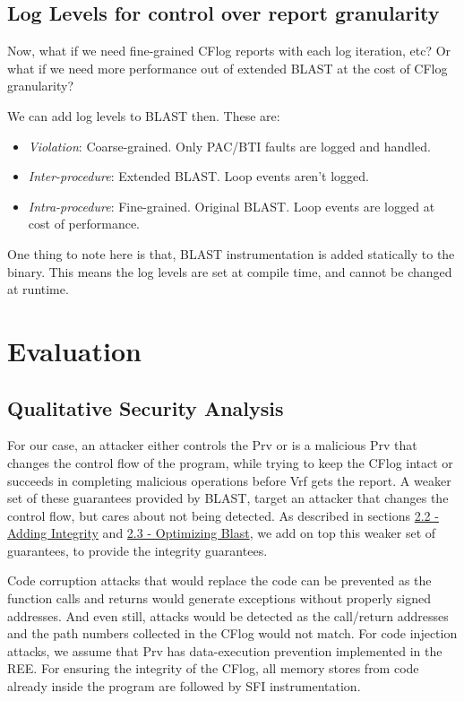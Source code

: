 \documentclass[a4paper, nobind]{templates/ociamthesis}
\providecommand{\tightlist}{%
  \setlength{\itemsep}{0pt}\setlength{\parskip}{0pt}}
\begin{document}
\section{Log Levels for control over report granularity}\label{log-levels-for-control-over-report-granularity}

Now, what if we need fine-grained CFlog reports with each log iteration, etc?
Or what if we need more performance out of extended BLAST at the cost of CFlog granularity?

We can add log levels to BLAST then. These are:

\begin{itemize}
\tightlist
\item
  \emph{Violation}: Coarse-grained. Only PAC/BTI faults are logged and handled.
\item
  \emph{Inter-procedure}: Extended BLAST. Loop events aren't logged.
\item
  \emph{Intra-procedure}: Fine-grained. Original BLAST. Loop events are logged at cost of performance.
\end{itemize}

One thing to note here is that, BLAST instrumentation is added statically to the binary.
This means the log levels are set at compile time, and cannot be changed at runtime.

\chapter{Evaluation}\label{evaluation}

\minitoc 

\section{Qualitative Security Analysis}\label{qualitative-security-analysis}

For our case, an attacker either controls the Prv or is a malicious Prv that changes
the control flow of the program, while trying to keep the CFlog intact
or succeeds in completing malicious operations before Vrf gets the report.
A weaker set of these guarantees provided by BLAST, target an attacker that changes the control flow,
but cares about not being detected.
As described in sections \hyperref[adding-integrity]{2.2 - Adding Integrity} and
\hyperref[optimizing-blast]{2.3 - Optimizing Blast}, we add on top this weaker set of guarantees,
to provide the integrity guarantees.

Code corruption attacks that would replace the code can be prevented
as the function calls and returns would generate exceptions without properly signed
addresses. And even still, attacks would be detected as the call/return addresses and
the path numbers collected in the CFlog would not match. For code injection attacks,
we assume that Prv has data-execution prevention implemented in the REE.
For ensuring the integrity of the CFlog, all memory stores from code already inside the
program are followed by SFI instrumentation.
\end{document}
